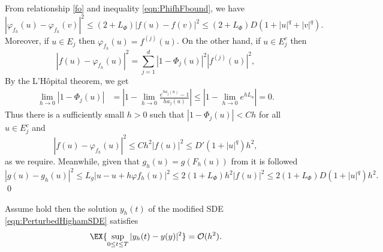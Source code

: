 \begin{pf}
	From relationship \eqref{fo} and inequality \eqref{eqn:PhifhFbound}, we have
	\begin{equation*}
		|\varphi_{f_h}(u) - \varphi_{f_h}(v)|^2
		\leq
			(2 + L_{\Phi}) |f(u) - f(v)|^2 
			\leq
				(2 + L_{\Phi}) D (1 + |u|^q +|v|^q). 
	\end{equation*}
	Moreover, if $u \in E_j$ then $\varphi_{f_h}(u) = f^{(j)}(u)$. On the other hand,  if $u\in E_j^c$ then
	$$
		|f(u) - \varphi_{f_h}(u)|^2
		=
		\sum_{j=1}^d
			|1-\Phi_j(u)|^2 |f^{(j)}(u)|^2,	
	$$
	 By the L'H\^{o}pital 
	theorem, we get
	\begin{align*}
		\lim_{h \to 0} |1-\Phi_j(u)| 
			&= \left|
				1-\lim_{h\to 0} \frac{e^{h a_j(u)}-1}{h a_j(u)}
			\right|			
			\leq 
				\left|
					1-\lim_{h\to 0} e^{h L_a}
				\right|=0.			
	\end{align*}
	Thus there is a sufficiently small $h>0$  such that
	$|1-\Phi_j(u)|<C h$ for all $u\in E_j^c$ and
	$$
		|f(u) - \varphi_{f_h}(u)|^2
		\leq
		Ch^2 |f(u)|^2
		\leq D'(1+|u|^q)h^2,	
	$$
	as we require. Meanwhile, given that $g_h(u)=g(F_h(u))$ from  it is followed
	\begin{equation*}
		|g(u) - g_h(u)|^2 
		\leq
			L_g |u - u +h \varphi{f_h}(u)|^2 
		\leq 
			2(1+L_{\Phi})h^2 |f(u)|^2
		\leq
			2(1+L_{\Phi}) D(1+|u|^q) h^2. 
	\end{equation*}
	\qed
\end{pf}
%
\begin{lem}\label{lem:yhyOh}
	Assume  hold then the solution $y_h(t)$ of 
	the modified SDE \eqref{eqn:PerturbedHighamSDE}
	satisfies
	\begin{equation}
		\EX{
			\sup_{0\leq t \leq T}
			|y_h(t) - y(y)|^2	
		} = \mathcal{O}(h^2).
	\end{equation}	
\end{lem}
